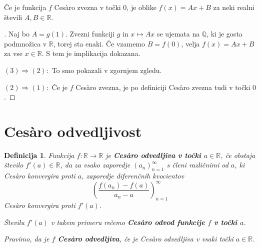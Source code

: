 \documentclass[10pt,hyperref={unicode}]{beamer}
\newtheorem{definicija}{Definicija}
\newenvironment{dokaz}{\begin{proof}[\bfseries\upshape\proofname]}{\end{proof}}
\begin{document}
\begin{frame}
    \begin{block}{}
        Če je funkcija $f$ Ces\`{a}ro zvezna v točki $0$, je oblike $f(x) = Ax + B$ za neki realni števili $A, B \in \mathbb{R}$.
    \end{block}
    \begin{dokaz}
        Naj bo $A = g(1)$. Zvezni funkciji $g$ in $x \mapsto Ax$ se ujemata na $\mathbb{Q}$, ki je gosta podmnožica v $\mathbb{R}$, torej sta enaki. Če vzamemo $B = f(0)$, velja $f(x) = Ax + B$ za vse $x \in \mathbb{R}$. S tem je implikacija dokazana.
        \pause

        \medskip
        $(3) \Rightarrow (2): $ To smo pokazali v zgornjem zgledu.
        \pause

        \medskip
        $(2) \Rightarrow (1): $ Če je $f$ Ces\`{a}ro zvezna, je po definiciji Ces\`{a}ro zvezna tudi v točki $0$.
    \end{dokaz}
\end{frame}



\section{Ces\`{a}ro odvedljivost}

\begin{frame}
    \begin{definicija}
        Funkcija $f: \mathbb{R} \rightarrow \mathbb{R}$ je \textbf{Ces\`{a}ro odvedljiva v točki $a \in \mathbb{R}$}, če obstaja število $f'(a) \in \mathbb{R}$, da za vsako zaporedje $(a_n)_{n=1}^{\infty}$ s členi različnimi od $a$, ki Ces\`{a}ro konvergira proti $a$, zaporedje diferenčnih kvocientov 
        $$\left( \frac{f(a_n)-f(a)}{a_n-a} \right)_{n=1}^{\infty}$$ 
        Ces\`{a}ro konvergira proti $f'(a)$. 
        \pause

        \medskip
        Številu $f'(a)$ v takem primeru rečemo \textbf{Ces\`{a}ro odvod funkcije $f$ v točki $a$}. 
        \pause

        \medskip
        Pravimo, da je $f$ \textbf{Ces\`{a}ro odvedljiva}, če je Ces\`{a}ro odvedljiva v vsaki točki $a \in \mathbb{R}$.
    \end{definicija}
\end{frame}
\end{document}
